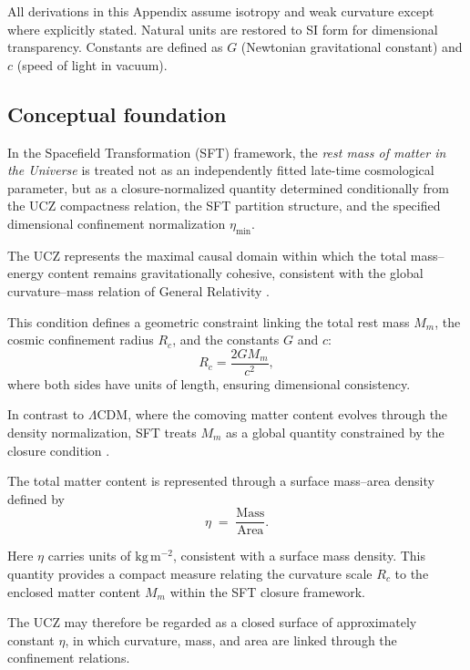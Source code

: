 \documentclass[12pt]{article}
\begin{document}
\noindent
All derivations in this Appendix assume isotropy and weak curvature except where explicitly stated.
Natural units are restored to SI form for dimensional transparency. Constants are defined as
$G$ (Newtonian gravitational constant) and $c$ (speed of light in vacuum).

\subsection{Conceptual foundation}

In the Spacefield Transformation (SFT) framework, the
\emph{rest mass of matter in the Universe} is treated not as an
independently fitted late-time cosmological parameter, but as a
closure-normalized quantity determined conditionally from the UCZ
compactness relation, the SFT partition structure, and the specified
dimensional confinement normalization $\eta_{\min}$.

The UCZ represents the maximal causal domain within which the total mass--energy
content remains gravitationally cohesive, consistent with the global
curvature--mass relation of General Relativity
\cite{Einstein1916,Weinberg1989}.

This condition defines a geometric constraint linking the total rest mass \(M_m\),
the cosmic confinement radius \(R_c\), and the constants \(G\) and \(c\):
\begin{equation}
R_c = \frac{2GM_m}{c^2},
\label{eq:Rc_def_mass}
\end{equation}
where both sides have units of length, ensuring dimensional consistency.

In contrast to $\Lambda$CDM, where the comoving matter content evolves through
the density normalization, SFT treats \(M_m\) as a global quantity constrained
by the closure condition
\cite{Padmanabhan2003,Ellis2007}.

The total matter content is represented through a
surface mass--area density defined by
\begin{equation}
\eta \;=\; \frac{\mathrm{Mass}}{\mathrm{Area}}.
\label{eq:eta_def_intro}
\end{equation}

Here \(\eta\) carries units of \(\mathrm{kg\,m^{-2}}\), consistent with a
surface mass density. This quantity provides a compact measure relating the
curvature scale \(R_c\) to the enclosed matter content \(M_m\) within the
SFT closure framework.

The UCZ may therefore be regarded as a closed surface of approximately constant
\(\eta\), in which curvature, mass, and area are linked through the confinement
relations.
\end{document}

